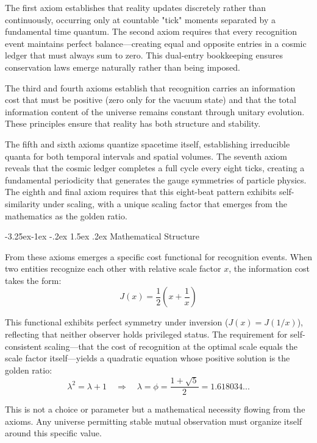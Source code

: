 \documentclass[11pt,a4paper]{article}
\makeatletter
\renewcommand\subsection{\@startsection{subsection}{2}{\z@}%
  {-3.25ex\@plus -1ex \@minus -.2ex}%
  {1.5ex \@plus .2ex}%
  {\normalfont\large\bfseries\color{darkblue}}}
\theoremstyle{definition}
\makeatother
\begin{document}
The first axiom establishes that reality updates discretely rather than continuously, occurring only at countable "tick" moments separated by a fundamental time quantum. The second axiom requires that every recognition event maintains perfect balance—creating equal and opposite entries in a cosmic ledger that must always sum to zero. This dual-entry bookkeeping ensures conservation laws emerge naturally rather than being imposed.

The third and fourth axioms establish that recognition carries an information cost that must be positive (zero only for the vacuum state) and that the total information content of the universe remains constant through unitary evolution. These principles ensure that reality has both structure and stability.

The fifth and sixth axioms quantize spacetime itself, establishing irreducible quanta for both temporal intervals and spatial volumes. The seventh axiom reveals that the cosmic ledger completes a full cycle every eight ticks, creating a fundamental periodicity that generates the gauge symmetries of particle physics. The eighth and final axiom requires that this eight-beat pattern exhibits self-similarity under scaling, with a unique scaling factor that emerges from the mathematics as the golden ratio.

\subsection{Mathematical Structure}

From these axioms emerges a specific cost functional for recognition events. When two entities recognize each other with relative scale factor $x$, the information cost takes the form:
\begin{equation}
J(x) = \frac{1}{2}\left(x + \frac{1}{x}\right)
\end{equation}

This functional exhibits perfect symmetry under inversion ($J(x) = J(1/x)$), reflecting that neither observer holds privileged status. The requirement for self-consistent scaling—that the cost of recognition at the optimal scale equals the scale factor itself—yields a quadratic equation whose positive solution is the golden ratio:
\begin{equation}
\lambda^2 = \lambda + 1 \quad \Rightarrow \quad \lambda = \phi = \frac{1 + \sqrt{5}}{2} = 1.618034...
\end{equation}

This is not a choice or parameter but a mathematical necessity flowing from the axioms. Any universe permitting stable mutual observation must organize itself around this specific value.
\end{document}

